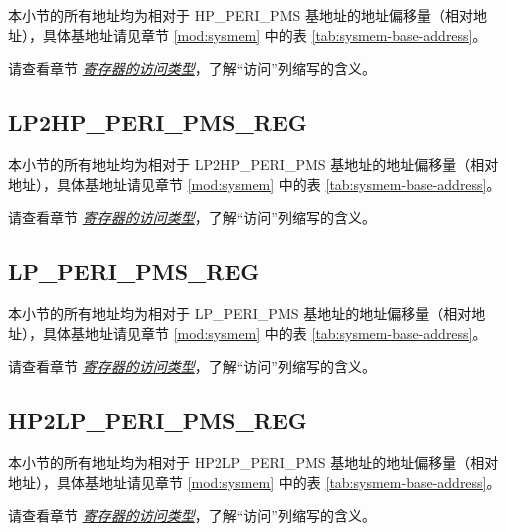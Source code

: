 \documentclass[main\_\_CN.tex]{subfiles}
\begin{document}
本小节的所有地址均为相对于 HP\_PERI\_PMS 基地址的地址偏移量（相对地址），具体基地址请见章节 \ref{mod:sysmem} \textit{} 中的表 \ref{tab:sysmem-base-address}。

请查看章节 \hyperref[glossary-access-types]{\textit{寄存器的访问类型}}，了解“访问”列缩写的含义。


\subsection{LP2HP\_PERI\_PMS\_REG}
\label{sec:permctrl-reg-lp2hp}

本小节的所有地址均为相对于 LP2HP\_PERI\_PMS 基地址的地址偏移量（相对地址），具体基地址请见章节 \ref{mod:sysmem} \textit{} 中的表 \ref{tab:sysmem-base-address}。

请查看章节 \hyperref[glossary-access-types]{\textit{寄存器的访问类型}}，了解“访问”列缩写的含义。



\subsection{LP\_PERI\_PMS\_REG}
\label{sec:permctrl-reg-lp}

本小节的所有地址均为相对于 LP\_PERI\_PMS 基地址的地址偏移量（相对地址），具体基地址请见章节 \ref{mod:sysmem}
\textit{} 中的表 \ref{tab:sysmem-base-address}。

请查看章节 \hyperref[glossary-access-types]{\textit{寄存器的访问类型}}，了解“访问”列缩写的含义。



\subsection{HP2LP\_PERI\_PMS\_REG}
\label{sec:permctrl-reg-hp2lp}

本小节的所有地址均为相对于 HP2LP\_PERI\_PMS 基地址的地址偏移量（相对地址），具体基地址请见章节 \ref{mod:sysmem}
\textit{} 中的表 \ref{tab:sysmem-base-address}。

请查看章节 \hyperref[glossary-access-types]{\textit{寄存器的访问类型}}，了解“访问”列缩写的含义。



\end{document}
